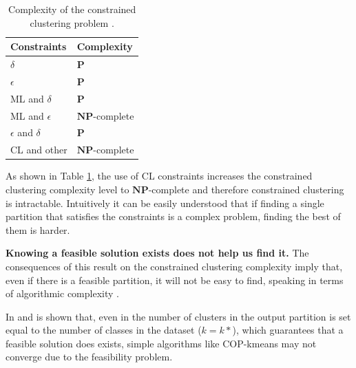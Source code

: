 \begin{table}[!h]
	\centering
	\begin{tabular}{ >{\centering\arraybackslash}m{3cm}  >{\centering\arraybackslash}m{3cm} }
		\hline
		\textbf{Constraints} & \textbf{Complexity} \\
		\hline
		$\delta$ & $\mathbf{P}$ \\
		$\epsilon$ & $\mathbf{P}$ \\
		\acs{ML} and $\delta$ & $\mathbf{P}$ \\
		\acs{ML} and $\epsilon$ & $\mathbf{NP}$-complete \\
		$\epsilon$ and $\delta$ & $\mathbf{P}$ \\
		\acs{CL} and other & $\mathbf{NP}$-complete \\
		\hline
		
	\end{tabular}%
	\caption[Complexity of the constrained clustering problem.]{Complexity of the constrained clustering problem \cite{davidson2007survey}.}
\label{tab:CCComplexity}
\end{table}

As shown in Table \ref{tab:CCComplexity}, the use of \acs{CL} constraints increases the constrained clustering complexity level to $\mathbf{NP}$-complete and therefore constrained clustering is intractable. Intuitively it can be easily understood that if finding a single partition that satisfies the constraints is a complex problem, finding the best of them is harder.

\begin{observation}
	
	\textbf{Knowing a feasible solution exists does not help us find it.} The consequences of this result on the constrained clustering complexity imply that, even if there is a feasible partition, it will not be easy to find, speaking in terms of algorithmic complexity \cite{davidson2007survey}.
	\label{ob:FeasibleSolution}
	
\end{observation}

In \cite{wagstaff2002intelligent} and \cite{davidson2007hierarchical} is shown that, even in the number of clusters in the output partition is set equal to the number of classes in the dataset ($k = k*$), which guarantees that a feasible solution does exists, simple algorithms like COP-kmeans \cite{wagstaff2001constrained} may not converge due to the feasibility problem.

